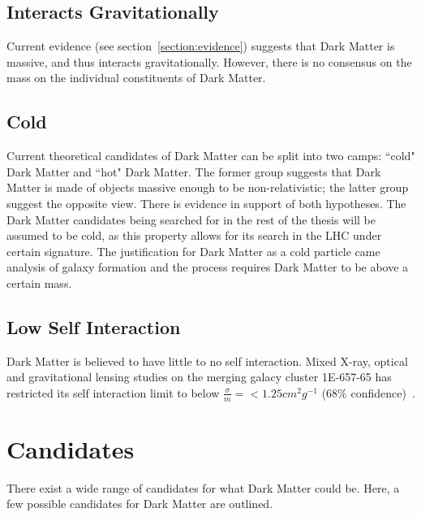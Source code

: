 \subsection{Interacts Gravitationally}
Current evidence (see section~\ref{section:evidence}) suggests that Dark Matter is massive, and thus interacts gravitationally. However, there is no consensus on the mass on the individual constituents of Dark Matter. 

\subsection{Cold}
Current theoretical candidates of Dark Matter can be split into two camps: ``cold" Dark Matter and ``hot" Dark Matter. The former group suggests that Dark Matter is made of objects massive enough to be non-relativistic; the latter group suggest the opposite view. There is evidence in support of both hypotheses. The Dark Matter candidates being searched for in the rest of the thesis will be assumed to be cold, as this property allows for its search in the LHC under certain signature. The
justification for Dark Matter as a cold particle came analysis of galaxy formation and the process requires Dark Matter to be above a certain mass. 

\subsection{Low Self Interaction}
Dark Matter is believed to have little to no self interaction. Mixed X-ray, optical and gravitational lensing studies on the merging galacy cluster 1E-657-65 has restricted its self interaction limit to below $\frac{\sigma}{m}= < 1.25 cm^{2} g^{-1}$ (68\% confidence)~\cite{randall2008constraints}. 
 

\section{Candidates}
\label{section:candidates}
There exist a wide range of candidates for what Dark Matter could be. Here, a few possible candidates for Dark Matter are outlined.

